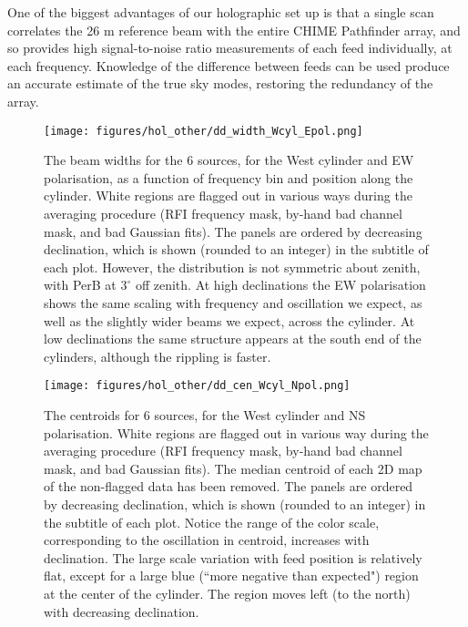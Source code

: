 One of the biggest advantages of our holographic set up is that a single scan correlates the 26 m reference beam with the entire CHIME Pathfinder array, and so provides high signal-to-noise ratio measurements of each feed individually, at each frequency. Knowledge of the difference between feeds can be used produce an accurate estimate of the true sky modes, restoring the redundancy of the array.

\begin{figure}[h!]
\begin{center}
\texttt{[image: figures/hol\_other/dd\_width\_Wcyl\_Epol.png]}
\caption{The beam widths for the 6 sources, for the West cylinder and EW polarisation, as a function of frequency bin and position along the cylinder. White regions are flagged out in various ways during the averaging procedure (RFI frequency mask, by-hand bad channel mask, and bad Gaussian fits). The panels are ordered by decreasing declination, which is shown (rounded to an integer) in the subtitle of each plot. However, the distribution is not symmetric about zenith, with PerB at $3^{\circ}$ off zenith. \newline At high declinations the EW polarisation shows the same scaling with frequency and oscillation we expect, as well as the slightly wider beams we expect, across the cylinder. At low declinations the same structure appears at the south end of the cylinders, although the rippling is faster.}
\label{widthWE}
\end{center}
\end{figure}

\begin{figure}[h!]
\begin{center}
\texttt{[image: figures/hol\_other/dd\_cen\_Wcyl\_Npol.png]}
\caption{The centroids for 6 sources, for the West cylinder and NS polarisation. White regions are flagged out in various way during the averaging procedure (RFI frequency mask, by-hand bad channel mask, and bad Gaussian fits). The median centroid of each 2D map of the non-flagged data has been removed. The panels are ordered by decreasing declination, which is shown (rounded to an integer) in the subtitle of each plot. Notice the range of the color scale, corresponding to the oscillation in centroid, increases with declination. The large scale variation with feed position is relatively flat, except for a large blue (``more negative than expected") region at the center of the cylinder. The region moves left (to the north) with decreasing declination.}
\label{cenWN}
\end{center}
\end{figure}

